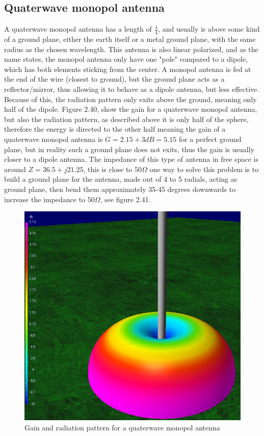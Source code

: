 \subsection{Quaterwave monopol antenna}
A quaterwave monopol antenna has a length of $\frac{\lambda}{4}$, and usually is above some kind of a ground plane, either the earth itself or a metal ground plane, with the same radius as the chosen wavelength. This antenna is also linear polarized, and as the name states, the monopol antenna only have one "pole" compared to a dipole, which has both elements sticking from the center. A monopol antenna is fed at the end of the wire (closest to ground), but the ground plane acts as a reflector/mirror, thus allowing it to behave as a dipole antenna, but less effective. Because of this, the radiation pattern only exits above the ground, meaning only half of the dipole. Figure 2.40, show the gain for a quaterwave monopol antenna, but also the radiation pattern, as described above it is only half of the sphere, therefore the energy is directed to the other half meaning the gain of a quaterwave monopol antenna is $G=2.15+3dB=5.15$ for a perfect ground plane, but in reality such a ground plane does not exits, thus the gain is usually closer to a dipole antenna. The impedance of this type of antenna in free space is around $Z=36.5+j21.25$\cite{ImpedanceMonopol}, this is close to $50\Omega$ one way to solve this problem is to build a ground plane for the antenna, made out of 4 to 5 radials, acting as ground plane, then bend them approximately 35-45 degrees downwards to increase the impedance to $50\Omega$, see figure 2.41. 

\begin{figure}[h]
\centering
\includegraphics[scale=0.50]{figures/quaterwaveMonoplAntenna.PNG}
\caption{Gain and radiation pattern for a quaterwave monopol antenna}
\end{figure}

